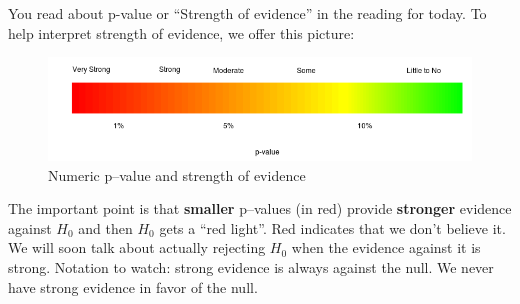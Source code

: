   You read about p-value or ``Strength of evidence'' in the reading
  for today.   To help interpret strength of evidence, we offer this picture:
 \begin{figure}[h]
   \centering
\includegraphics[width=\linewidth]{../plots/pvalueStrengths.png}
   \caption{Numeric p--value and strength of evidence}
   \label{fig:SOE-pvalue}
 \end{figure}

  The important point is that {\bf smaller} p--values (in red) provide {\bf
    stronger} evidence against $H_0$ and then $H_0$ gets a ``red
  light''. Red indicates that we don't believe it.  We will soon talk
  about actually rejecting $H_0$ when the evidence against it is
  strong.  Notation to watch:  strong evidence is always against the
  null. We never have strong evidence in favor of the null.  



